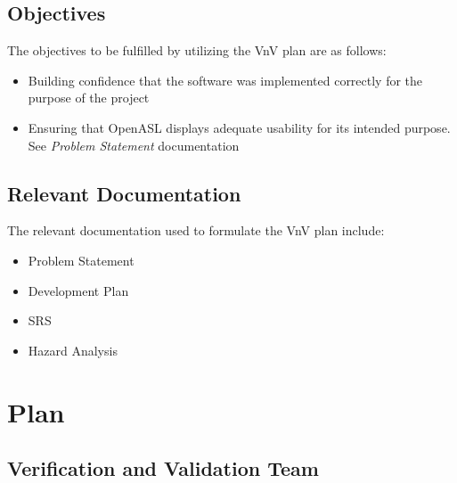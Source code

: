 \documentclass[12pt]{article}
\begin{document}

\subsection{Objectives}

The objectives to be fulfilled by utilizing the VnV plan are as follows:\\
\begin{itemize}
  \item Building confidence that the software was implemented correctly for the purpose of the project
  \item Ensuring that OpenASL displays adequate usability for its intended purpose. See \emph{Problem Statement} \citep{ProbState} documentation
\end{itemize}

\subsection{Relevant Documentation}

The relevant documentation used to formulate the VnV plan include:\\
\begin{itemize}
  \item Problem Statement \citep{ProbState}
  \item Development Plan \citep{DevPlan}
  \item SRS \citep{SRS}
  \item Hazard Analysis \citep{Hazard}
\end{itemize}

\section{Plan}


\subsection{Verification and Validation Team}
\end{document}

